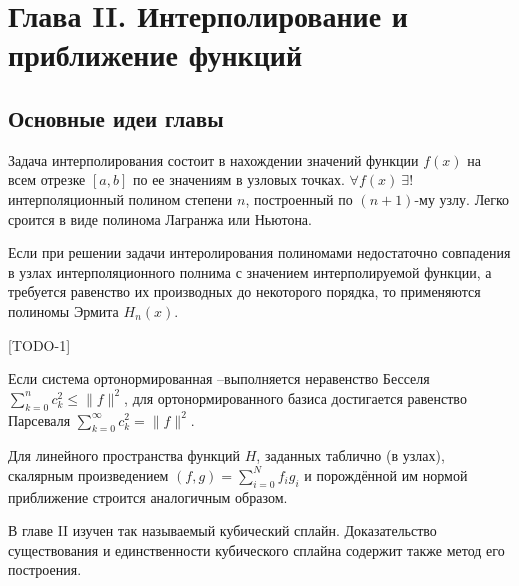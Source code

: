 \newpage
{}
\pagestyle{empty}
\vspace{0.5cm}

\section*{Глава II. Интерполирование и приближение функций}

\subsection{Основные идеи главы} 

Задача интерполирования состоит в нахождении значений функции $f(x)$
на всем отрезке $[a,b]$ по ее значениям в узловых точках. $\forall f(x)~\exists!$ интерполяционный полином степени $n$, построенный по $(n+1)$-му узлу. Легко сроится в виде полинома Лагранжа или Ньютона.

Если при решении задачи интеролирования полиномами недостаточно совпадения в узлах интерполяционного полнима с значением интерполируемой функции, а требуется равенство их производных до некоторого порядка, то применяются полиномы Эрмита $H_n (x)$.

[TODO-1]

Если система ортонормированная –выполняется неравенство Бесселя $\sum_{k=0}^n c_k^2 \leqslant \|f\|^2$, для ортонормированного базиса достигается равенство Парсеваля $\sum_{k=0}^\infty c_k^2 = \|f\|^2.$

Для линейного пространства функций $H$, заданных таблично (в узлах),  скалярным произведением $(f,g) = \sum\limits_{i=0}^N f_i g_i$ и порождённой им нормой приближение строится аналогичным образом.

В главе II изучен так называемый кубический сплайн. Доказательство существования и единственности кубического сплайна содержит также метод его построения.
\newpage

